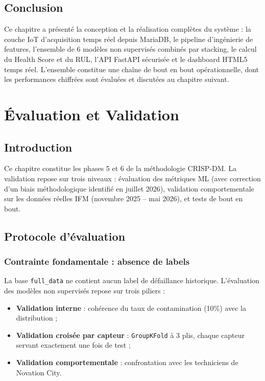 \documentclass[12pt,a4paper]{report}
\begin{document}
\section{Conclusion}

Ce chapitre a présenté la conception et la réalisation complètes du système : la couche IoT
d'acquisition temps réel depuis MariaDB, le pipeline d'ingénierie de features, l'ensemble de
6 modèles non supervisés combinés par stacking, le calcul du Health Score et du RUL,
l'API FastAPI sécurisée et le dashboard HTML5 temps réel. L'ensemble constitue une chaîne de
bout en bout opérationnelle, dont les performances chiffrées sont évaluées et discutées au
chapitre suivant.



\chapter{Évaluation et Validation}

\section*{Introduction}

Ce chapitre constitue les phases 5 et 6 de la méthodologie CRISP-DM. La validation
repose sur trois niveaux : évaluation des métriques ML (avec correction d'un biais
méthodologique identifié en juillet 2026), validation comportementale sur les données
réelles IFM (novembre 2025 -- mai 2026), et tests de bout en bout.

\section{Protocole d'évaluation}

\subsection{Contrainte fondamentale : absence de labels}
\label{subsec:absence_labels}

La base \texttt{full\_data} ne contient aucun label de défaillance historique. L'évaluation
des modèles non supervisés repose sur trois piliers :
\begin{itemize}
  \item \textbf{Validation interne} : cohérence du taux de contamination (10\%) avec la distribution ;
  \item \textbf{Validation croisée par capteur} : \texttt{GroupKFold} \cite{pedregosa2011} à 3 plis, chaque capteur servant exactement une fois de test ;
  \item \textbf{Validation comportementale} : confrontation avec les techniciens de Novation City.
\end{itemize}
\end{document}
